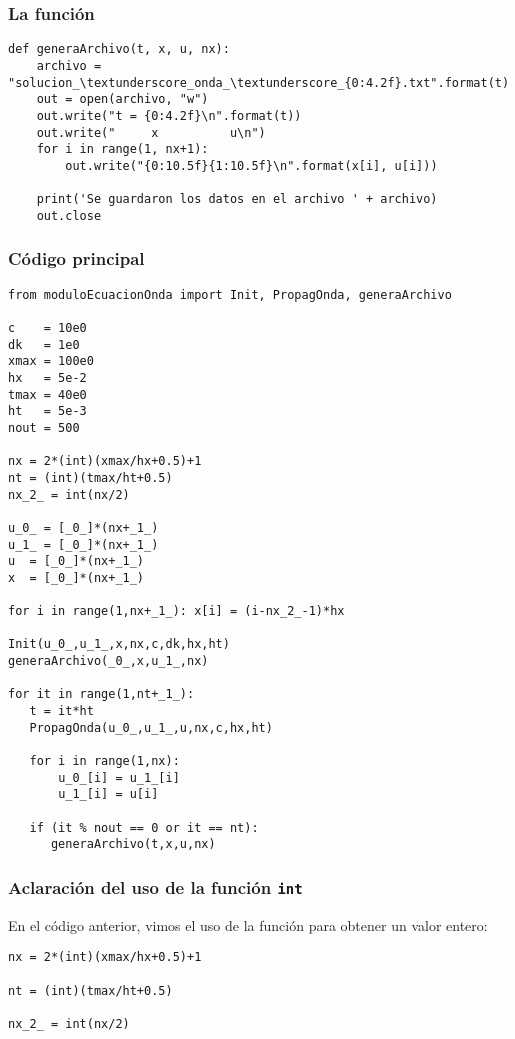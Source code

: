 \begin{frame}
\frametitle{La función }
\begin{lstlisting}[caption=Código para generar archivos de texto plano con los arreglos solución, style=FormattedNumber, basicstyle=\linespread{1.1}\ttfamily=\small, columns=fullflexible]
def generaArchivo(t, x, u, nx):
    archivo = "solucion_\textunderscore_onda_\textunderscore_{0:4.2f}.txt".format(t)
    out = open(archivo, "w")
    out.write("t = {0:4.2f}\n".format(t))
    out.write("     x          u\n")
    for i in range(1, nx+1):
        out.write("{0:10.5f}{1:10.5f}\n".format(x[i], u[i]))
      
    print('Se guardaron los datos en el archivo ' + archivo)
    out.close
\end{lstlisting}
\end{frame}
\begin{frame}
\frametitle{Código principal}
\begin{lstlisting}[caption=Código principal para el problema de la ecuación de onda, style=FormattedNumber, basicstyle=\linespread{1.1}\ttfamily=\small, columns=fullflexible]
from moduloEcuacionOnda import Init, PropagOnda, generaArchivo

c    = 10e0
dk   = 1e0
xmax = 100e0
hx   = 5e-2
tmax = 40e0
ht   = 5e-3
nout = 500

nx = 2*(int)(xmax/hx+0.5)+1
nt = (int)(tmax/ht+0.5)
nx_2_ = int(nx/2)

u_0_ = [_0_]*(nx+_1_)
u_1_ = [_0_]*(nx+_1_)
u  = [_0_]*(nx+_1_)
x  = [_0_]*(nx+_1_)

for i in range(1,nx+_1_): x[i] = (i-nx_2_-1)*hx

Init(u_0_,u_1_,x,nx,c,dk,hx,ht) 
generaArchivo(_0_,x,u_1_,nx)

for it in range(1,nt+_1_):
   t = it*ht
   PropagOnda(u_0_,u_1_,u,nx,c,hx,ht)

   for i in range(1,nx):
       u_0_[i] = u_1_[i]
       u_1_[i] = u[i]

   if (it % nout == 0 or it == nt):
      generaArchivo(t,x,u,nx)
\end{lstlisting}
\end{frame}
\begin{frame}[fragile]
\frametitle{Aclaración del uso de la función \texttt{int}}
En el código anterior, vimos el uso de la función  para obtener un valor entero:
\begin{lstlisting}[caption=Uso de la función \texttt{int}, style=FormattedNumber, basicstyle=\linespread{1.1}\ttfamily=\small, columns=fullflexible]
nx = 2*(int)(xmax/hx+0.5)+1

nt = (int)(tmax/ht+0.5)

nx_2_ = int(nx/2)
\end{lstlisting}
\end{frame}

